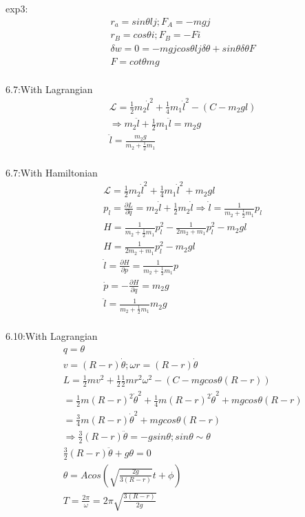 \documentclass{article}
\begin{document}
exp3:
\begin{align*}
&r_a=sin\theta l j ;F_A=-mg j\\
&r_B=cos\theta i;F_B=-Fi \\
& \delta w=0=-mgj cos\theta l j \delta \theta +sin\theta \delta \theta F \\
&F= cot\theta mg \\
\end{align*}

6.7:With Lagrangian
\begin{align*}
&\mathcal L=\frac12m_2\dot l^2+\frac14m_1\dot l^2-(C-m_2gl) \\
&\Rightarrow m_2\ddot l+\frac12 m_1 \ddot l=m_2g \\
&\ddot l=\frac{m_2g}{m_2+\frac12 m_1} \\
\end{align*}

6.7:With Hamiltonian
\begin{align*}
&\mathcal L=\frac12m_2\dot l^2+\frac14 m_1\dot l^2+m_2 gl \\
&p_l=\frac{ \partial L}{ \partial \dot q}=m_2 \dot l+\frac12m_2 \dot l\Rightarrow \dot l=\frac1{m_2+\frac12 m_1}p_l \\
&H=\frac1{m_2+\frac12m_1}p_l^2-\frac1{2m_2+m_1} p_l^2-m_2gl  \\
&H=\frac1{2m_2+m_1}p_l^2-m_2gl \\
&\dot l=\frac{ \partial H}{ \partial p}=\frac1{m_2+\frac12m_1}p\\
&\dot p=-\frac{ \partial H}{ \partial q}=m_2g\\
&\ddot l=\frac1{m_2+\frac12m_1}m_2g \\
\end{align*}

6.10:With Lagrangian
\begin{align*}
&q=\theta \\
&v=(R-r)\dot\theta;\omega r=(R-r)\dot \theta \\
&L=\frac12mv^2+\frac12\frac12mr^2 \omega^2-(C-mgcos\theta (R-r)) \\
&=\frac12m(R-r)^2\dot\theta^2+\frac14m(R-r)^2\dot\theta^2+mgcos\theta(R-r) \\
&=\frac34m(R-r)\dot\theta^2+mgcos\theta(R-r) \\
&\Rightarrow \frac32(R-r)\ddot\theta=-gsin\theta;sin\theta \sim \theta \\
&\frac32(R-r)\ddot \theta+g\theta=0 \\
&\theta=Acos(\sqrt{\frac{2g}{3(R-r)}}t+\phi) \\
&T=\frac{2\pi}{\omega}=2\pi \sqrt{\frac{3(R-r)}{2g}} \\
\end{align*}
\end{document}
